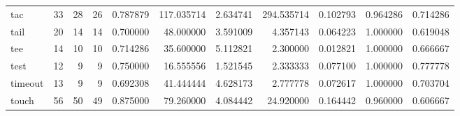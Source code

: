 \begin{tabular}{lrrrrrrrrrr}
tac       &                                      33 &                 28 &                                26 &                                   0.787879 &                             117.035714 &                                     2.634741 &                        294.535714 &                                0.102793 &                           0.964286 &                                           0.714286 \\
tail      &                                      20 &                 14 &                                14 &                                   0.700000 &                              48.000000 &                                     3.591009 &                          4.357143 &                                0.064223 &                           1.000000 &                                           0.619048 \\
tee       &                                      14 &                 10 &                                10 &                                   0.714286 &                              35.600000 &                                     5.112821 &                          2.300000 &                                0.012821 &                           1.000000 &                                           0.666667 \\
test      &                                      12 &                  9 &                                 9 &                                   0.750000 &                              16.555556 &                                     1.521545 &                          2.333333 &                                0.077100 &                           1.000000 &                                           0.777778 \\
timeout   &                                      13 &                  9 &                                 9 &                                   0.692308 &                              41.444444 &                                     4.628173 &                          2.777778 &                                0.072617 &                           1.000000 &                                           0.703704 \\
touch     &                                      56 &                 50 &                                49 &                                   0.875000 &                              79.260000 &                                     4.084442 &                         24.920000 &                                0.164442 &                           0.960000 &                                           0.606667 \\

\end{tabular}
